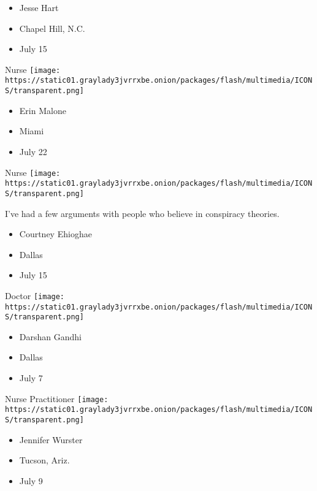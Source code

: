 \begin{itemize}
\tightlist
\item
  Jesse Hart
\item
  Chapel Hill, N.C.
\item
  July 15
\end{itemize}

\protect\hyperlink{item-erin-malone}{}

Nurse
\texttt{[image: https://static01.graylady3jvrrxbe.onion/packages/flash/multimedia/ICONS/transparent.png]}

\begin{itemize}
\tightlist
\item
  Erin Malone
\item
  Miami
\item
  July 22
\end{itemize}

\protect\hyperlink{item-courtney-ehioghae}{}

Nurse
\texttt{[image: https://static01.graylady3jvrrxbe.onion/packages/flash/multimedia/ICONS/transparent.png]}

I've had a few arguments with people who believe in conspiracy theories.

\begin{itemize}
\tightlist
\item
  Courtney Ehioghae
\item
  Dallas
\item
  July 15
\end{itemize}

\protect\hyperlink{item-darshan-gandhi}{}

Doctor
\texttt{[image: https://static01.graylady3jvrrxbe.onion/packages/flash/multimedia/ICONS/transparent.png]}

\begin{itemize}
\tightlist
\item
  Darshan Gandhi
\item
  Dallas
\item
  July 7
\end{itemize}

\protect\hyperlink{item-jennifer-wurster}{}

Nurse Practitioner
\texttt{[image: https://static01.graylady3jvrrxbe.onion/packages/flash/multimedia/ICONS/transparent.png]}

\begin{itemize}
\tightlist
\item
  Jennifer Wurster
\item
  Tucson, Ariz.
\item
  July 9
\end{itemize}

